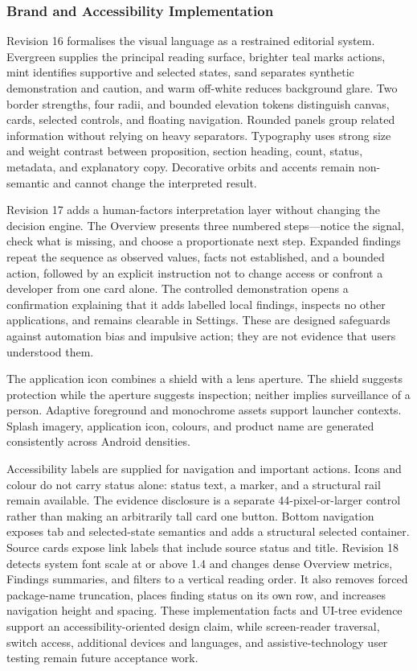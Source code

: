 \subsubsection{Brand and Accessibility Implementation}

Revision 16 formalises the visual language as a restrained editorial system. Evergreen supplies the principal reading surface, brighter teal marks actions, mint identifies supportive and selected states, sand separates synthetic demonstration and caution, and warm off-white reduces background glare. Two border strengths, four radii, and bounded elevation tokens distinguish canvas, cards, selected controls, and floating navigation. Rounded panels group related information without relying on heavy separators. Typography uses strong size and weight contrast between proposition, section heading, count, status, metadata, and explanatory copy. Decorative orbits and accents remain non-semantic and cannot change the interpreted result.

Revision 17 adds a human-factors interpretation layer without changing the decision engine. The Overview presents three numbered steps---notice the signal, check what is missing, and choose a proportionate next step. Expanded findings repeat the sequence as observed values, facts not established, and a bounded action, followed by an explicit instruction not to change access or confront a developer from one card alone. The controlled demonstration opens a confirmation explaining that it adds labelled local findings, inspects no other applications, and remains clearable in Settings. These are designed safeguards against automation bias and impulsive action; they are not evidence that users understood them.

The application icon combines a shield with a lens aperture. The shield suggests protection while the aperture suggests inspection; neither implies surveillance of a person. Adaptive foreground and monochrome assets support launcher contexts. Splash imagery, application icon, colours, and product name are generated consistently across Android densities.

Accessibility labels are supplied for navigation and important actions. Icons and colour do not carry status alone: status text, a marker, and a structural rail remain available. The evidence disclosure is a separate 44-pixel-or-larger control rather than making an arbitrarily tall card one button. Bottom navigation exposes tab and selected-state semantics and adds a structural selected container. Source cards expose link labels that include source status and title. Revision 18 detects system font scale at or above 1.4 and changes dense Overview metrics, Findings summaries, and filters to a vertical reading order. It also removes forced package-name truncation, places finding status on its own row, and increases navigation height and spacing. These implementation facts and UI-tree evidence support an accessibility-oriented design claim, while screen-reader traversal, switch access, additional devices and languages, and assistive-technology user testing remain future acceptance work.

